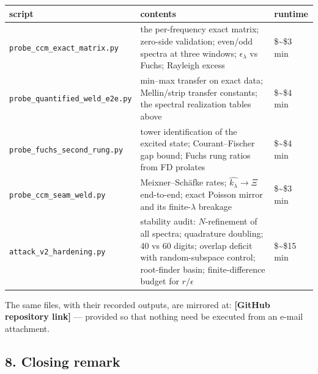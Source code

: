 \documentclass[
  letterpaper,
  11pt]{article}
\newcounter{none} %
\theoremstyle{plain}
\theoremstyle{definition}
\theoremstyle{remark}
\begin{document}
{\def\LTcaptype{none} %
\begin{longtable}[]{@{}
  >{\raggedright\arraybackslash}p{}
  >{\raggedright\arraybackslash}p{}
  >{\raggedright\arraybackslash}p{}@{}}
\toprule\noalign{}
\begin{minipage}[b]{\linewidth}\raggedright
script
\end{minipage} & \begin{minipage}[b]{\linewidth}\raggedright
contents
\end{minipage} & \begin{minipage}[b]{\linewidth}\raggedright
runtime
\end{minipage} \\
\midrule\noalign{}
\endhead
\bottomrule\noalign{}
\endlastfoot
\texttt{probe\_ccm\_exact\_matrix.py} & the per-frequency exact matrix; zero-side validation; even/odd spectra at three windows; \(\epsilon_\lambda\) vs Fuchs; Rayleigh excess & \$\sim\$3 min \\
\texttt{probe\_quantified\_weld\_e2e.py} & min--max transfer on exact data; Mellin/strip transfer constants; the spectral realization tables above & \$\sim\$4 min \\
\texttt{probe\_fuchs\_second\_rung.py} & tower identification of the excited state; Courant--Fischer gap bound; Fuchs rung ratios from FD prolates & \$\sim\$4 min \\
\texttt{probe\_ccm\_seam\_weld.py} & Meixner--Schäfke rates; \(\widehat{k_\lambda}\to\Xi\) end-to-end; exact Poisson mirror and its finite-\(\lambda\) breakage & \$\sim\$3 min \\
\texttt{attack\_v2\_hardening.py} & stability audit: \(N\)-refinement of all spectra; quadrature doubling; 40 vs 60 digits; overlap deficit with random-subspace control; root-finder basin; finite-difference budget for \(r/\epsilon\) & \$\sim\$15 min \\
\end{longtable}
}

The same files, with their recorded outputs, are mirrored at: \textbf{{[}GitHub repository link{]}} --- provided so that nothing need be executed from an e-mail attachment.

\subsection{8. Closing remark}\label{closing-remark}
\end{document}
